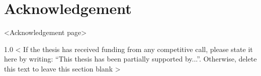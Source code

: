 %
\section*{Acknowledgement}
\label{sec::acknowledgement}


<Acknowledgement page>

\vspace{\fill}
\begin{spacing}{1.0}
< If the thesis has received funding from any competitive call, please state it here by writing: “This thesis has been partially supported by...”. Otherwise, delete this text to leave this section blank >
\end{spacing}




